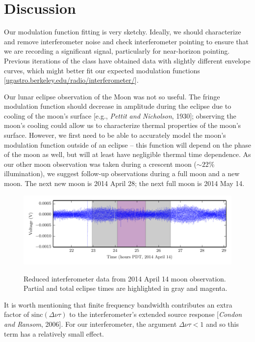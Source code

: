 \documentclass[10pt]{article}
\begin{document}
\section{Discussion}

Our modulation function fitting is very sketchy.  Ideally, we should characterize and remove interferometer noise and check interferometer pointing to ensure that we are recording a significant signal, particularly for near-horizon pointing.  Previous iterations of the class have obtained data with slightly different envelope curves, which might better fit our expected modulation functions [\href{http://ugastro.berkeley.edu/radio/interferometer/}
{ugastro.berkeley.edu/radio/interferometer/}].

Our lunar eclipse observation of the Moon was not so useful.  The fringe modulation function should decrease in amplitude during the eclipse due to cooling of the moon's surface [e.g., \textit{Pettit and Nicholson}, 1930]; observing the moon's cooling could allow us to characterize thermal properties of the moon's surface.  However, we first need to be able to accurately model the moon's modulation function outside of an eclipse -- this function will depend on the phase of the moon as well, but will at least have negligible thermal time dependence.  As our other moon observation was taken during a crescent moon ($\sim22\%$ illumination), we suggest follow-up observations during a full moon and a new moon.  The next new moon is 2014 April 28; the next full moon is 2014 May 14.

\begin{figure}[!ht]
    \centering
    \includegraphics{plots/moon_eclipse_nice_clean.pdf} \\
    \caption{Reduced interferometer data from 2014 April 14 moon observation.  Partial and total eclipse times are highlighted in gray and magenta.}
    \label{fig:eclipse}
\end{figure}

It is worth mentioning that finite frequency bandwidth contributes an extra factor of $\mathrm{sinc} (\Delta\nu\tau)$ to the interferometer's extended source response [\textit{Condon and Ransom}, 2006].  For our interferometer, the argument $\Delta\nu\tau < 1$ and so this term has a relatively small effect.
\end{document}
